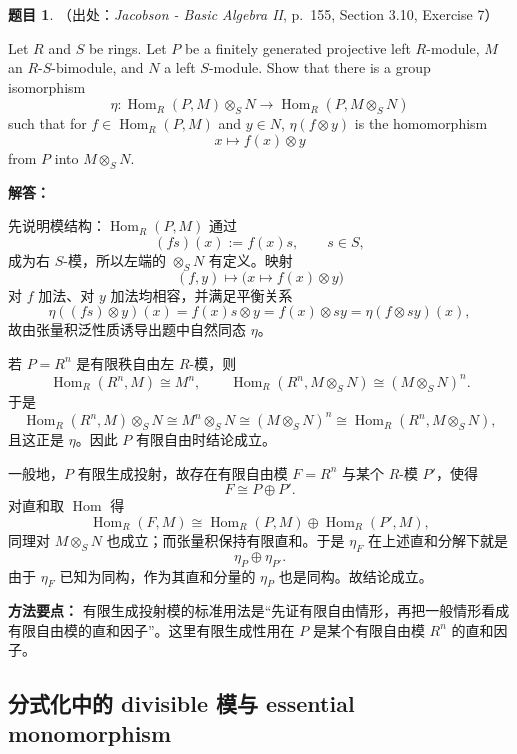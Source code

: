 \documentclass[a4paper]{ctexart}
\theoremstyle{definition}
\newtheorem{example}{题目}[section]
\theoremstyle{analysis}
\theoremstyle{plain}
\begin{document}
\begin{example}
（出处：\textit{Jacobson - Basic Algebra II}, p.~155, Section 3.10, Exercise 7）

Let \(R\) and \(S\) be rings. Let \(P\) be a finitely generated projective left
\(R\)-module, \(M\) an \(R\)-\(S\)-bimodule, and \(N\) a left \(S\)-module. Show
that there is a group isomorphism
\[
  \eta:\operatorname{Hom}_R(P,M)\otimes_S N
  \longrightarrow
  \operatorname{Hom}_R(P,M\otimes_S N)
\]
such that for \(f\in\operatorname{Hom}_R(P,M)\) and \(y\in N\),
\(\eta(f\otimes y)\) is the homomorphism
\[
  x\longmapsto f(x)\otimes y
\]
from \(P\) into \(M\otimes_S N\).

\textbf{解答：}

先说明模结构：\(\operatorname{Hom}_R(P,M)\) 通过
\[
  (fs)(x):=f(x)s,\qquad s\in S,
\]
成为右 \(S\)-模，所以左端的 \(\otimes_S N\) 有定义。映射
\[
  (f,y)\longmapsto \bigl(x\mapsto f(x)\otimes y\bigr)
\]
对 \(f\) 加法、对 \(y\) 加法均相容，并满足平衡关系
\[
  \eta((fs)\otimes y)(x)
  =f(x)s\otimes y
  =
  f(x)\otimes sy
  =
  \eta(f\otimes sy)(x),
\]
故由张量积泛性质诱导出题中自然同态 \(\eta\)。

若 \(P=R^n\) 是有限秩自由左 \(R\)-模，则
\[
  \operatorname{Hom}_R(R^n,M)\cong M^n,
  \qquad
  \operatorname{Hom}_R(R^n,M\otimes_S N)\cong (M\otimes_S N)^n.
\]
于是
\[
  \operatorname{Hom}_R(R^n,M)\otimes_S N
  \cong
  M^n\otimes_S N
  \cong
  (M\otimes_S N)^n
  \cong
  \operatorname{Hom}_R(R^n,M\otimes_S N),
\]
且这正是 \(\eta\)。因此 \(P\) 有限自由时结论成立。

一般地，\(P\) 有限生成投射，故存在有限自由模 \(F=R^n\) 与某个 \(R\)-模 \(P'\)，使得
\[
  F\cong P\oplus P'.
\]
对直和取 \(\operatorname{Hom}\) 得
\[
  \operatorname{Hom}_R(F,M)
  \cong
  \operatorname{Hom}_R(P,M)\oplus \operatorname{Hom}_R(P',M),
\]
同理对 \(M\otimes_S N\) 也成立；而张量积保持有限直和。于是 \(\eta_F\) 在上述直和分解下就是
\[
  \eta_P\oplus \eta_{P'}.
\]
由于 \(\eta_F\) 已知为同构，作为其直和分量的 \(\eta_P\) 也是同构。故结论成立。

\textbf{方法要点：}
有限生成投射模的标准用法是“先证有限自由情形，再把一般情形看成有限自由模的直和因子”。这里有限生成性用在 \(P\) 是某个有限自由模 \(R^n\) 的直和因子。
\end{example}

\subsection{\texorpdfstring{分式化中的 divisible 模与 essential monomorphism}{分式化中的 divisible 模与 essential monomorphism}}\label{subsec:problem-essential-monomorphism-fraction}
\end{document}

